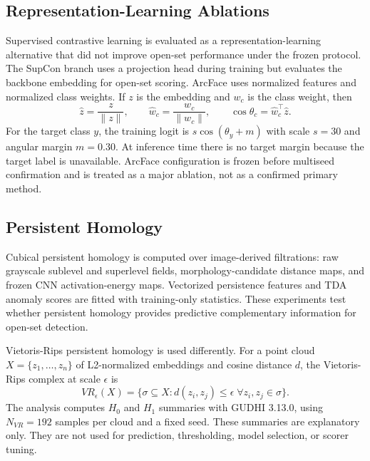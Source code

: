 \subsection{Representation-Learning Ablations}

Supervised contrastive learning is evaluated as a representation-learning alternative that did not improve open-set performance under the frozen protocol. The SupCon branch uses a projection head during training but evaluates the backbone embedding for open-set scoring. ArcFace uses normalized features and normalized class weights. If $z$ is the embedding and $w_c$ is the class weight, then
\[
\hat{z}=\frac{z}{\lVert z\rVert},\qquad \hat{w}_c=\frac{w_c}{\lVert w_c\rVert},\qquad \cos\theta_c=\hat{w}_c^\top \hat{z}.
\]
For the target class $y$, the training logit is $s\cos(\theta_y+m)$ with scale $s=30$ and angular margin $m=0.30$. At inference time there is no target margin because the target label is unavailable. ArcFace configuration is frozen before multiseed confirmation and is treated as a major ablation, not as a confirmed primary method.

\subsection{Persistent Homology}

Cubical persistent homology is computed over image-derived filtrations: raw grayscale sublevel and superlevel fields, morphology-candidate distance maps, and frozen CNN activation-energy maps. Vectorized persistence features and TDA anomaly scores are fitted with training-only statistics. These experiments test whether persistent homology provides predictive complementary information for open-set detection.

Vietoris-Rips persistent homology is used differently. For a point cloud $X=\{z_1,\ldots,z_n\}$ of L2-normalized embeddings and cosine distance $d$, the Vietoris-Rips complex at scale $\epsilon$ is
\[
VR_\epsilon(X)=\{\sigma\subseteq X: d(z_i,z_j)\leq \epsilon\;\forall z_i,z_j\in\sigma\}.
\]
The analysis computes $H_0$ and $H_1$ summaries with GUDHI 3.13.0, using $N_{VR}=192$ samples per cloud and a fixed seed. These summaries are explanatory only. They are not used for prediction, thresholding, model selection, or scorer tuning.

